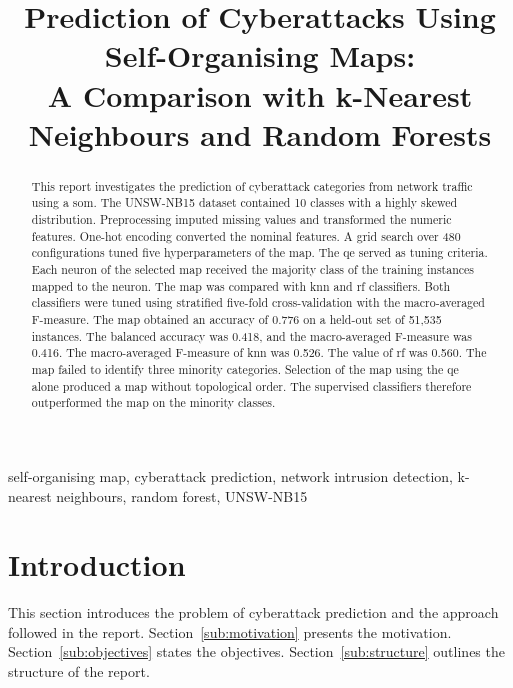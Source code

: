 \documentclass[conference]{IEEEtran}
\title{Prediction of Cyberattacks Using Self-Organising Maps:\\
A Comparison with k-Nearest Neighbours and Random Forests}
\author{
    \IEEEauthorblockN{M Tashreeq Hartogh}
    \IEEEauthorblockA{
        27163245\\
        Department of Computer Science\\
        Stellenbosch University\\
        Stellenbosch, South Africa\\
        https://github.com/calebwidogast96-art/Unsupervised-SOM.git
    }
}
\begin{document}
\maketitle

\begin{abstract}
This report investigates the prediction of cyberattack categories from network traffic
using a \gls{som}. The UNSW-NB15 dataset contained 10 classes with a highly skewed distribution.
Preprocessing imputed missing values and transformed the numeric features.
One-hot encoding converted the nominal features.
A grid search over 480 configurations tuned five hyperparameters of the map.
The \gls{qe} served as tuning criteria.
Each neuron of the selected map received the majority class of the training instances mapped to the neuron.
The map was compared with \gls{knn} and \gls{rf} classifiers.
Both classifiers were tuned using stratified five-fold cross-validation with the macro-averaged F-measure.
The map obtained an accuracy of 0.776 on a held-out set of 51,535 instances.
The balanced accuracy was 0.418, and the macro-averaged F-measure was 0.416.
The macro-averaged F-measure of \gls{knn} was 0.526.
The value of \gls{rf} was 0.560.
The map failed to identify three minority categories.
Selection of the map using the \gls{qe} alone produced a map without topological order.
The supervised classifiers therefore outperformed the map on the minority classes.
\end{abstract}

\begin{IEEEkeywords}
self-organising map, cyberattack prediction, network intrusion detection, k-nearest neighbours,
random forest, UNSW-NB15
\end{IEEEkeywords}

\glsresetall


\section{Introduction}
\label{sec:introduction}

This section introduces the problem of cyberattack prediction and the approach followed in the report.
Section~\ref{sub:motivation} presents the motivation.
Section~\ref{sub:objectives} states the objectives.
Section~\ref{sub:structure} outlines the structure of the report.
\end{document}
